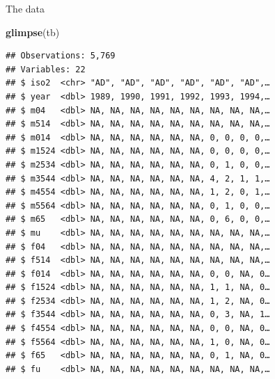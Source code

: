 \documentclass[ignorenonframetext,]{beamer}
\newenvironment{Shaded}{\begin{snugshade}}{\end{snugshade}}
\newcommand{\KeywordTok}[1]{\textcolor[rgb]{0.13,0.29,0.53}{\textbf{#1}}}
\newcommand{\NormalTok}[1]{#1}
\begin{document}
\begin{frame}[fragile]{The data}
\protect\hypertarget{the-data-4}{}

\begin{Shaded}
\begin{Highlighting}[]
\KeywordTok{glimpse}\NormalTok{(tb)}
\end{Highlighting}
\end{Shaded}

\begin{verbatim}
## Observations: 5,769
## Variables: 22
## $ iso2  <chr> "AD", "AD", "AD", "AD", "AD", "AD",…
## $ year  <dbl> 1989, 1990, 1991, 1992, 1993, 1994,…
## $ m04   <dbl> NA, NA, NA, NA, NA, NA, NA, NA, NA,…
## $ m514  <dbl> NA, NA, NA, NA, NA, NA, NA, NA, NA,…
## $ m014  <dbl> NA, NA, NA, NA, NA, NA, 0, 0, 0, 0,…
## $ m1524 <dbl> NA, NA, NA, NA, NA, NA, 0, 0, 0, 0,…
## $ m2534 <dbl> NA, NA, NA, NA, NA, NA, 0, 1, 0, 0,…
## $ m3544 <dbl> NA, NA, NA, NA, NA, NA, 4, 2, 1, 1,…
## $ m4554 <dbl> NA, NA, NA, NA, NA, NA, 1, 2, 0, 1,…
## $ m5564 <dbl> NA, NA, NA, NA, NA, NA, 0, 1, 0, 0,…
## $ m65   <dbl> NA, NA, NA, NA, NA, NA, 0, 6, 0, 0,…
## $ mu    <dbl> NA, NA, NA, NA, NA, NA, NA, NA, NA,…
## $ f04   <dbl> NA, NA, NA, NA, NA, NA, NA, NA, NA,…
## $ f514  <dbl> NA, NA, NA, NA, NA, NA, NA, NA, NA,…
## $ f014  <dbl> NA, NA, NA, NA, NA, NA, 0, 0, NA, 0…
## $ f1524 <dbl> NA, NA, NA, NA, NA, NA, 1, 1, NA, 0…
## $ f2534 <dbl> NA, NA, NA, NA, NA, NA, 1, 2, NA, 0…
## $ f3544 <dbl> NA, NA, NA, NA, NA, NA, 0, 3, NA, 1…
## $ f4554 <dbl> NA, NA, NA, NA, NA, NA, 0, 0, NA, 0…
## $ f5564 <dbl> NA, NA, NA, NA, NA, NA, 1, 0, NA, 0…
## $ f65   <dbl> NA, NA, NA, NA, NA, NA, 0, 1, NA, 0…
## $ fu    <dbl> NA, NA, NA, NA, NA, NA, NA, NA, NA,…
\end{verbatim}

\end{frame}
\end{document}
